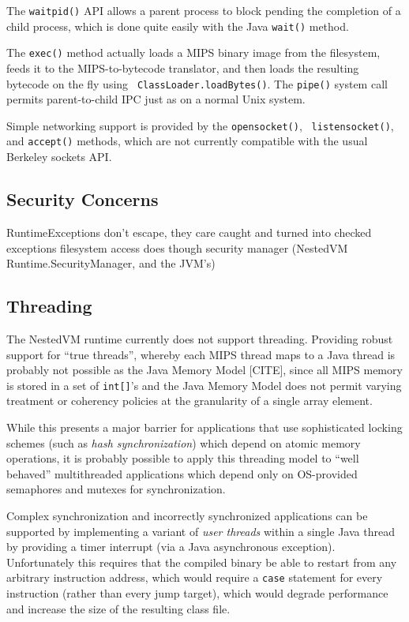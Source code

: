 \documentclass{acmconf}
\begin{document}
The {\tt waitpid()} API allows a parent process to block pending the
completion of a child process, which is done quite easily with the
Java {\tt wait()} method.

The {\tt exec()} method actually loads a MIPS binary image from the
filesystem, feeds it to the MIPS-to-bytecode translator, and then
loads the resulting bytecode on the fly using {\tt
ClassLoader.loadBytes()}.  The {\tt pipe()} system call permits
parent-to-child IPC just as on a normal Unix system.

Simple networking support is provided by the {\tt opensocket()}, {\tt
listensocket()}, and {\tt accept()} methods, which are not currently
compatible with the usual Berkeley sockets API.


\subsection{Security Concerns}

RuntimeExceptions don't escape, they care caught and turned into
checked exceptions filesystem access does though security manager
(NestedVM Runtime.SecurityManager, and the JVM's)


\subsection{Threading}

The NestedVM runtime currently does not support threading.  Providing
robust support for ``true threads'', whereby each MIPS thread maps to
a Java thread is probably not possible as the Java Memory Model
[CITE], since all MIPS memory is stored in a set of {\tt int[]}'s and
the Java Memory Model does not permit varying treatment or coherency
policies at the granularity of a single array element.

While this presents a major barrier for applications that use
sophisticated locking schemes (such as {\it hash synchronization})
which depend on atomic memory operations, it is probably possible to
apply this threading model to ``well behaved'' multithreaded
applications which depend only on OS-provided semaphores and mutexes
for synchronization.

Complex synchronization and incorrectly synchronized applications can
be supported by implementing a variant of {\it user threads} within a
single Java thread by providing a timer interrupt (via a Java
asynchronous exception).  Unfortunately this requires that the
compiled binary be able to restart from any arbitrary instruction
address, which would require a {\tt case} statement for every
instruction (rather than every jump target), which would degrade
performance and increase the size of the resulting class file.
\end{document}
